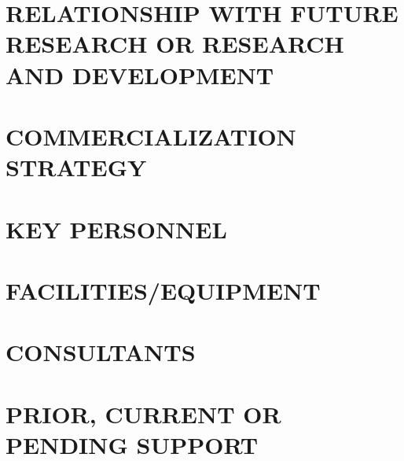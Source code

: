 \documentclass[letterpaper,11pt,onecolumn]{article}
\begin{document}
\section{RELATIONSHIP WITH FUTURE RESEARCH OR RESEARCH AND DEVELOPMENT}

\section{COMMERCIALIZATION STRATEGY}

\section{KEY PERSONNEL}

\section{FACILITIES/EQUIPMENT}

\section{CONSULTANTS}

\section{PRIOR, CURRENT OR PENDING SUPPORT}



\end{document}
